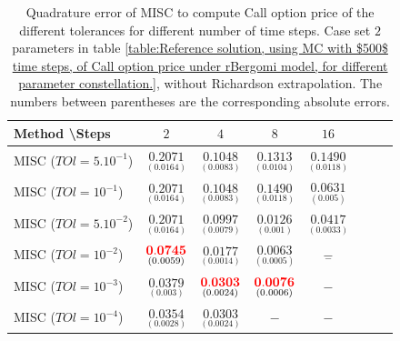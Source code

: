 \documentclass[11pt]{article}
\begin{document}
\begin{table}[h!]
	\centering
	\begin{tabular}{l*{6}{c}r}
		Method \textbackslash  Steps            & $2$ & $4$ & $8$ & $16$  \\
		\hline
		MISC ($TOl=5.10^{-1}$)  & $\underset{(0.0164)}{\mathbf{0.2071}}$ & $\underset{(0.0083)}{\mathbf{0.1048}}$ & $\underset{(0.0104)}{\mathbf{0.1313}}$ & $\underset{(0.0118)}{\mathbf{0.1490}}$  \\
		MISC ($TOl=10^{-1}$)  & $\underset{(0.0164)}{\mathbf{0.2071}}$ & $\underset{(0.0083)}{\mathbf{0.1048}}$ & $\underset{(0.0118)}{\mathbf{0.1490}}$ & $\underset{(0.005)}{\mathbf{0.0631}}$  \\
			MISC ($TOl=5.10^{-2}$)  &$\underset{(0.0164)}{\mathbf{0.2071}}$ & $\underset{(0.0079)}{\mathbf{0.0997}}$ & $\underset{(0.001)}{\mathbf{0.0126}}$ & $\underset{(0.0033)}{\mathbf{0.0417}}$  \\
	MISC ($TOl=10^{-2}$)  & $\underset{(0.0059)}{\mathbf{{\color{red}0.0745}}}$ & $\underset{(0.0014)}{\mathbf{0.0177}}$ & $\underset{(0.0005)}{\mathbf{0.0063}}$ & $\underset{-}{\mathbf{-}}$  \\
		MISC ($TOl=10^{-3}$)        & $\underset{(0.003)}{\mathbf{0.0379}}$  &$\underset{(0.0024)}{\mathbf{{\color{red}0.0303}}}$  &  $\underset{(0.0006)}{\mathbf{{\color{red}0.0076}}}$ &  $-$ \\
	MISC ($TOl=10^{-4}$)        & $\underset{(0.0028)}{\mathbf{0.0354}} $ &$\underset{(0.0024)}{\mathbf{0.0303}}$ &  $-$ &  $-$ \\	
		
		\hline
	\end{tabular}
	\caption{Quadrature error of MISC to compute Call option price of the different tolerances for different number of time steps. Case  set $2$ parameters in table \ref{table:Reference solution, using MC with $500$ time steps, of Call option price under rBergomi model, for different parameter constellation.}, without Richardson extrapolation. The numbers between parentheses are the corresponding absolute errors.}
	\label{Quadrature error of MISC to compute Call option price of the different tolerances for different number of time steps. Case  set $2$ parameters, without Richardson extrapolation. The numbers between parentheses are the corresponding absolute errors.}
\end{table}
\end{document}
